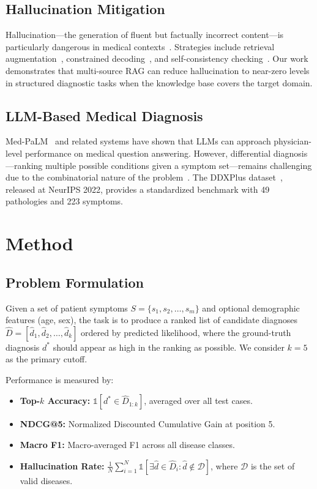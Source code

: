 \documentclass[preprint,12pt]{elsarticle}
\begin{document}
\subsection{Hallucination Mitigation}

Hallucination---the generation of fluent but factually incorrect content---is particularly dangerous in medical contexts~\cite{ji2023survey,umapathi2023med}. Strategies include retrieval augmentation~\cite{shuster2021retrieval}, constrained decoding~\cite{lu2022neurologic}, and self-consistency checking~\cite{manakul2023selfcheckgpt}. Our work demonstrates that multi-source RAG can reduce hallucination to near-zero levels in structured diagnostic tasks when the knowledge base covers the target domain.

\subsection{LLM-Based Medical Diagnosis}

Med-PaLM~\cite{singhal2023large} and related systems have shown that LLMs can approach physician-level performance on medical question answering. However, differential diagnosis---ranking multiple possible conditions given a symptom set---remains challenging due to the combinatorial nature of the problem~\cite{mcduff2023towards}. The DDXPlus dataset~\cite{fansi2022ddxplus}, released at NeurIPS 2022, provides a standardized benchmark with 49 pathologies and 223 symptoms.

\section{Method}
\label{sec:method}

\subsection{Problem Formulation}

Given a set of patient symptoms $S = \{s_1, s_2, \ldots, s_m\}$ and optional demographic features (age, sex), the task is to produce a ranked list of candidate diagnoses $\hat{D} = [\hat{d}_1, \hat{d}_2, \ldots, \hat{d}_k]$ ordered by predicted likelihood, where the ground-truth diagnosis $d^*$ should appear as high in the ranking as possible. We consider $k{=}5$ as the primary cutoff.

Performance is measured by:
\begin{itemize}
    \item \textbf{Top-$k$ Accuracy:} $\mathbb{1}[d^* \in \hat{D}_{1:k}]$, averaged over all test cases.
    \item \textbf{NDCG@5:} Normalized Discounted Cumulative Gain at position 5.
    \item \textbf{Macro F1:} Macro-averaged F1 across all disease classes.
    \item \textbf{Hallucination Rate:} $\frac{1}{N}\sum_{i=1}^{N} \mathbb{1}[\exists \hat{d} \in \hat{D}_i : \hat{d} \notin \mathcal{D}]$, where $\mathcal{D}$ is the set of valid diseases.
\end{itemize}
\end{document}
